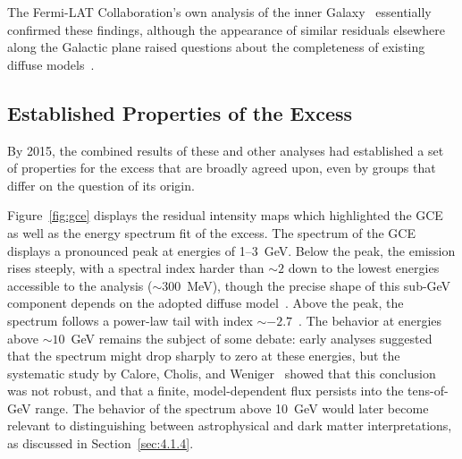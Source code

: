 The Fermi-LAT Collaboration's own analysis of the inner Galaxy~\cite{Fermi-LAT:2015sau} essentially confirmed these findings, although the appearance of similar residuals elsewhere along the Galactic plane raised questions about the completeness of existing diffuse models~\cite{Calore:2014xka}.

\subsection{Established Properties of the Excess}
\label{sec:4.1.3}

By 2015, the combined results of these and other analyses had established a set of properties for the excess that are broadly agreed upon, even by groups that differ on the question of its origin.

Figure~\ref{fig:gce} displays the residual intensity maps which highlighted the GCE as well as the energy spectrum fit of the excess.
The spectrum of the GCE displays a pronounced peak at energies of 1--3~GeV.
Below the peak, the emission rises steeply, with a spectral index harder than $\sim 2$ down to the lowest energies accessible to the analysis ($\sim 300$~MeV), though the precise shape of this sub-GeV component depends on the adopted diffuse model~\cite{Calore:2014xka}.
Above the peak, the spectrum follows a power-law tail with index $\sim -2.7$~\cite{Calore:2014xka,Daylan:2014rsa}.
The behavior at energies above $\sim 10$~GeV remains the subject of some debate: early analyses suggested that the spectrum might drop sharply to zero at these energies, but the systematic study by Calore, Cholis, and Weniger~\cite{Calore:2014xka} showed that this conclusion was not robust, and that a finite, model-dependent flux persists into the tens-of-GeV range.
The behavior of the spectrum above 10~GeV would later become relevant to distinguishing between astrophysical and dark matter interpretations, as discussed in Section~\ref{sec:4.1.4}.

